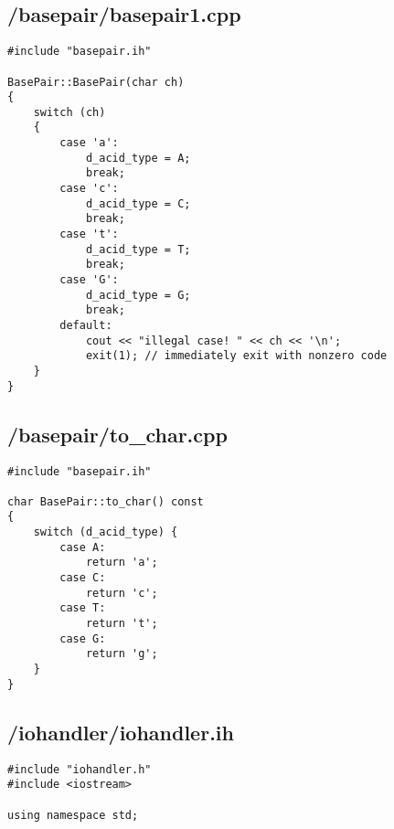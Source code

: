 \documentclass{article}
\begin{document}
\subsection*{/basepair/basepair1.cpp}
\begin{verbatim}
#include "basepair.ih"

BasePair::BasePair(char ch)
{
    switch (ch)
    {
        case 'a':
            d_acid_type = A;
            break;
        case 'c':
            d_acid_type = C;
            break;
        case 't':
            d_acid_type = T;
            break;
        case 'G':
            d_acid_type = G;
            break;
        default:
            cout << "illegal case! " << ch << '\n';
            exit(1); // immediately exit with nonzero code
    }
}

\end{verbatim}
\subsection*{/basepair/to\_char.cpp}
\begin{verbatim}
#include "basepair.ih"

char BasePair::to_char() const
{
    switch (d_acid_type) {
        case A:
            return 'a';
        case C:
            return 'c';
        case T:
            return 't';
        case G:
            return 'g';
    }
}
\end{verbatim}

\subsection*{/iohandler/iohandler.ih}
\begin{verbatim}
#include "iohandler.h"
#include <iostream>

using namespace std;

\end{verbatim}
\end{document}
